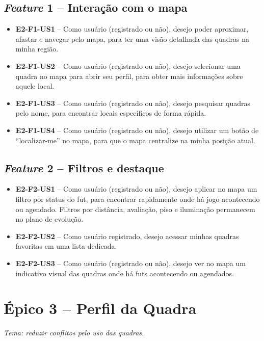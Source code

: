 \begin{apendicesenv}
    \subsection*{\textit{Feature} 1 -- Interação com o mapa}
    \begin{itemize}
        \item \textbf{E2-F1-US1} -- Como usuário (registrado ou não), desejo poder aproximar, afastar e navegar pelo mapa, para ter uma visão detalhada das quadras na minha região.
        \item \textbf{E2-F1-US2} -- Como usuário (registrado ou não), desejo selecionar uma quadra no mapa para abrir seu perfil, para obter mais informações sobre aquele local.
        \item \textbf{E2-F1-US3} -- Como usuário (registrado ou não), desejo pesquisar quadras pelo nome, para encontrar locais específicos de forma rápida.
        \item \textbf{E2-F1-US4} -- Como usuário (registrado ou não), desejo utilizar um botão de “localizar-me” no mapa, para que o mapa centralize na minha posição atual.
    \end{itemize}

    \subsection*{\textit{Feature} 2 -- Filtros e destaque}
    \begin{itemize}
        \item \textbf{E2-F2-US1} -- Como usuário (registrado ou não), desejo aplicar no mapa um filtro por status do fut, para encontrar rapidamente onde há jogo acontecendo ou agendado. Filtros por distância, avaliação, piso e iluminação permanecem no plano de evolução.
        \item \textbf{E2-F2-US2} -- Como usuário registrado, desejo acessar minhas quadras favoritas em uma lista dedicada.
        \item \textbf{E2-F2-US3} -- Como usuário (registrado ou não), desejo ver no mapa um indicativo visual das quadras onde há futs acontecendo ou agendados.
    \end{itemize}

    \section*{Épico 3 -- Perfil da Quadra}
    \textit{Tema: reduzir conflitos pelo uso das quadras.}


\end{apendicesenv}
